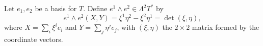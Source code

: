 Let $e_1, e_2$ be a basis for $T$. Define $e^1 \wedge e^2 \in \Lambda^2 T^*$ by
$$e^1 \wedge e^2(X, Y) = \xi^1 \eta^2 - \xi^2 \eta^1 = \det(\xi, \eta),$$
where $X = \sum_i \xi^i e_i$ and $Y = \sum_j \eta^j e_j$, with $(\xi, \eta)$ the $2 \times 2$ matrix formed by the coordinate vectors.
